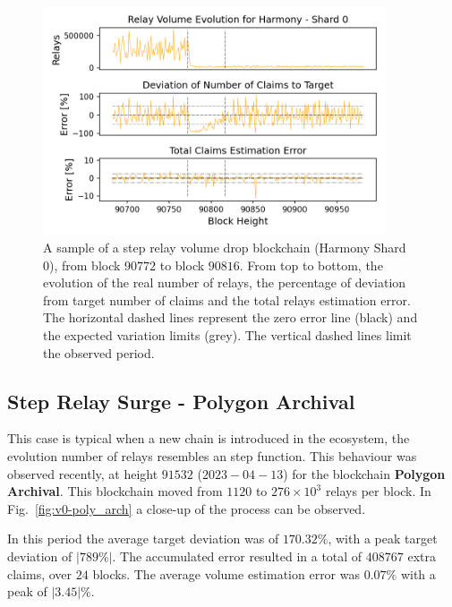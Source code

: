 \documentclass[runningheads]{llncs}
\begin{document}
\begin{figure}
    \includegraphics[width=0.9\textwidth]{v0_harmony.png}
    \caption{A sample of a step relay volume drop blockchain (Harmony Shard 0), from block $90772$  to block $90816$. From top to bottom, the evolution of the real number of relays, the percentage of deviation from target number of claims and the total relays estimation error. The horizontal dashed lines represent the zero error line (black) and the expected variation limits (grey). The vertical dashed lines limit the observed period.} \label{fig:v0-harmony}
\end{figure}

\subsection{Step Relay Surge - Polygon Archival}

This case is typical when a new chain is introduced in the ecosystem, the evolution number of relays resembles an step function. This behaviour was observed recently, at height $91532$ ($2023-04-13$) for the blockchain \textbf{Polygon Archival}. This blockchain moved from $1120$ to $276\times 10^3$ relays per block. In Fig.~\ref{fig:v0-poly_arch} a close-up of the process can be observed.

In this period the average target deviation was of $170.32\%$, with a peak target deviation of $|789 \%|$. The accumulated error resulted in a total of $408767$ extra claims, over $24$ blocks. The average volume estimation error was $0.07 \%$ with a peak of $|3.45| \%$.
\end{document}
